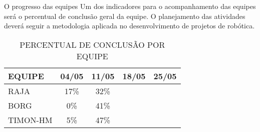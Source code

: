 \begin{frame}[t]{O progresso das equipes}
    Um dos indicadores para o acompanhamento das equipes será o percentual de conclusão geral da equipe.
    O planejamento das atividades deverá seguir a metodologia aplicada no desenvolvimento de projetos de robótica.
    \newline
    \begin{table}[ht!]
    \centering
        \caption{PERCENTUAL DE CONCLUSÃO POR EQUIPE}
        \begin{tabular}{|l|c|c|c|c|} \hline
            \textbf{EQUIPE}&\textbf{04/05}&\textbf{11/05}&\textbf{18/05}&\textbf{25/05}\\ \hline
            RAJA & 17\% &32\% & &  \\ \hline
            BORG & 0\% &41\% & &  \\ \hline
            TIMON-HM & 5\% &47\% & &  \\ \hline
        \end{tabular}
    \end{table}
\end{frame}
